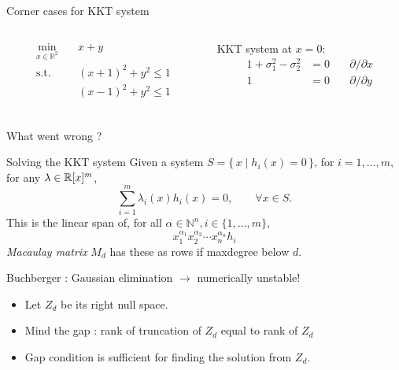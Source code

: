\documentclass{beamer}
\begin{document}
\begin{frame}{Corner cases for KKT system}
  \begin{columns}
    \begin{column}{0.4\textwidth}
      \begin{align*}
        \min_{x \in \mathbb{R}^2} \quad & x + y\\
        \text{s.t.} \quad & (x + 1)^2 + y^2 \le 1\\
                          & (x - 1)^2 + y^2 \le 1\\
      \end{align*}
    \end{column}
    \begin{column}{0.4\textwidth}
      KKT system at $x = 0$:
      \begin{align*}
        1 + \sigma_1^2 - \sigma_2^2 & = 0 & \quad \partial/\partial x\\
        1 & = 0 & \quad \partial/\partial y
      \end{align*}
    \end{column}
  \end{columns}
  \vspace{-3em}
  \begin{center}
  \end{center}
  \begin{block}{What went wrong ?}
  \end{block}
\end{frame}

\begin{frame}{Solving the KKT system}
  Given a system $S = \{\, x \mid h_i(x) = 0 \,\}$, for $i = 1, \ldots, m$,
  for any $\lambda \in \mathbb{R}[x]^m$,
  \[
    \sum_{i=1}^m \lambda_i(x) h_i(x) = 0, \qquad \forall x \in S.
  \]
  This is the linear span of,
  for all $\alpha \in \mathbb{N}^n, i \in \{1, \ldots, m\}$,
  \[
    x_1^{\alpha_1}x_2^{\alpha_2} \cdots x_n^{\alpha_n} h_i
  \]
  \emph{\alert{Macaulay} matrix} $M_d$ has these as rows if maxdegree below $d$.

  Buchberger : \alert{Gaussian elimination} $\to$ \alert{numerically unstable}!

  \begin{itemize}
    \item Let $Z_d$ be its right null space.
    \item \alert{Mind the gap} : rank of truncation of $Z_d$ equal to rank of $Z_d$
    \item Gap condition is \alert{sufficient} for finding the solution from $Z_d$.
  \end{itemize}
\end{frame}
\end{document}
